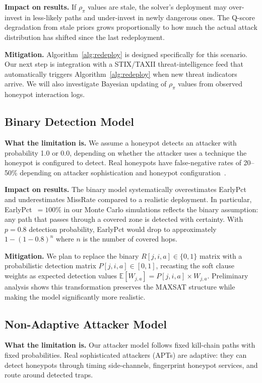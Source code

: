 \documentclass[journal]{IEEEtran}
\begin{document}
\textbf{Impact on results.}
If $\rho_\pi$ values are stale, the solver's deployment
may over-invest in less-likely paths and under-invest in
newly dangerous ones.
The Q-score degradation from stale priors grows
proportionally to how much the actual attack distribution
has shifted since the last redeployment.

\textbf{Mitigation.}
Algorithm~\ref{alg:redeploy} is designed specifically for
this scenario.
Our next step is integration with a STIX/TAXII
threat-intelligence feed that automatically triggers
Algorithm~\ref{alg:redeploy} when new threat indicators
arrive.
We will also investigate Bayesian updating of $\rho_\pi$
values from observed honeypot interaction logs.

\subsection{Binary Detection Model}

\textbf{What the limitation is.}
We assume a honeypot detects an attacker with probability
1.0 or 0.0, depending on whether the attacker uses a
technique the honeypot is configured to detect.
Real honeypots have false-negative rates of 20--50\%
depending on attacker sophistication and honeypot
configuration~\cite{huang2019}.

\textbf{Impact on results.}
The binary model systematically overestimates EarlyPct
and underestimates MissRate compared to a realistic
deployment.
In particular, EarlyPct~$=100\%$ in our Monte Carlo
simulations reflects the binary assumption: any path that
passes through a covered zone is detected with certainty.
With $p=0.8$ detection probability, EarlyPct would drop to
approximately $1-(1-0.8)^n$ where $n$ is the number of
covered hops.

\textbf{Mitigation.}
We plan to replace the binary $R[j,i,a]\in\{0,1\}$ matrix
with a probabilistic detection matrix $P[j,i,a]\in[0,1]$,
recasting the soft clause weights as expected detection
values $\mathbb{E}[W_{j,a}]=P[j,i,a]\times W_{j,a}$.
Preliminary analysis shows this transformation preserves
the MAXSAT structure while making the model significantly
more realistic.

\subsection{Non-Adaptive Attacker Model}

\textbf{What the limitation is.}
Our attacker model follows fixed kill-chain paths with
fixed probabilities.
Real sophisticated attackers (APTs) are adaptive: they can
detect honeypots through timing side-channels, fingerprint
honeypot services, and route around detected traps.
\end{document}
